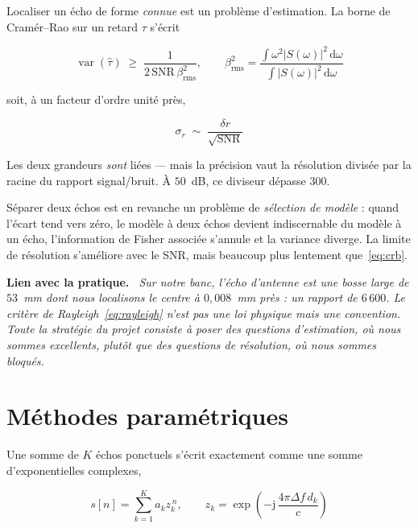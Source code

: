 \documentclass[11pt,a4paper]{article}
\newenvironment{implication}%
  {\par\medskip\begin{lrbox}{\implbox}\begin{minipage}{0.95\textwidth}%
   \textbf{Lien avec la pratique.}\itshape\ }%
  {\end{minipage}\end{lrbox}\noindent\fbox{\usebox{\implbox}}\par\medskip}
\newcommand{\jj}{\mathrm{j}}
\begin{document}
Localiser un écho de forme \emph{connue} est un problème d'estimation. La borne
de Cramér--Rao sur un retard $\tau$ s'écrit

\begin{equation}
\operatorname{var}(\hat\tau) \;\geq\;
   \frac{1}{2\,\mathrm{SNR}\,\beta_{\text{rms}}^{2}},
\qquad
\beta_{\text{rms}}^{2} =
   \frac{\int \omega^{2}|S(\omega)|^{2}\,\mathrm{d}\omega}
        {\int |S(\omega)|^{2}\,\mathrm{d}\omega}
\end{equation}

soit, à un facteur d'ordre unité près,

\begin{equation}
\boxed{\;\sigma_r \;\sim\; \frac{\delta r}{\sqrt{\mathrm{SNR}}}\;}
\label{eq:crb}
\end{equation}

Les deux grandeurs \emph{sont} liées --- mais la précision vaut la résolution
divisée par la racine du rapport signal/bruit. À $50$~dB, ce diviseur dépasse
$300$.

Séparer deux échos est en revanche un problème de \emph{sélection de modèle} :
quand l'écart tend vers zéro, le modèle à deux échos devient indiscernable du
modèle à un écho, l'information de Fisher associée s'annule et la variance
diverge. La limite de résolution s'améliore avec le SNR, mais beaucoup plus
lentement que~\eqref{eq:crb}.

\begin{implication}
Sur notre banc, l'écho d'antenne est une bosse large de $53$~mm dont nous
localisons le centre à $0{,}008$~mm près : un rapport de $6\,600$. Le critère de
Rayleigh~\eqref{eq:rayleigh} n'est pas une loi physique mais une convention.
Toute la stratégie du projet consiste à poser des questions d'estimation, où
nous sommes excellents, plutôt que des questions de résolution, où nous sommes
bloqués.
\end{implication}

\section{Méthodes paramétriques}
\label{sec:esprit}

Une somme de $K$ échos ponctuels s'écrit exactement comme une somme
d'exponentielles complexes,

\begin{equation}
s[n] = \sum_{k=1}^{K} a_k z_k^{\,n},
\qquad
z_k = \exp\!\left(-\jj\,\frac{4\pi \Delta f\, d_k}{c}\right)
\end{equation}
\end{document}
